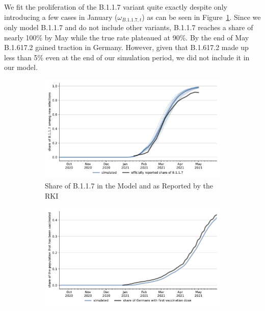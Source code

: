 \FloatBarrier

We fit the proliferation of the B.1.1.7 variant quite exactly despite only introducing a
few cases in January ($\omega_{B.1.1.7,t}$) as can be seen in
Figure~\ref{fig:fit_share_b117}. Since we only model B.1.1.7 and do not include other
variants, B.1.1.7 reaches a share of nearly 100\% by May while the true rate plateaued at
90\%. By the end of May B.1.617.2 gained traction in Germany. However, given that
B.1.617.2 made up less than 5\% even at the end of our simulation period, we did not
include it in our model.

\begin{figure}[ht]
  \centering

  \begin{subfigure}[b]{0.425\textwidth}   %
    \centering
    \includegraphics[width=\textwidth]{figures/results/figures/scenario_comparisons/combined_fit/full_share_b117_with_single_runs}
    \caption{Share of B.1.1.7 in the Model and as Reported by the RKI}
    \label{fig:fit_share_b117}
  \end{subfigure}
  \hfill
  \begin{subfigure}[b]{0.425\textwidth}    %
    \centering
    \includegraphics[width=\textwidth]{figures/results/figures/scenario_comparisons/combined_fit/full_ever_vaccinated}

\end{subfigure}
\end{figure}
